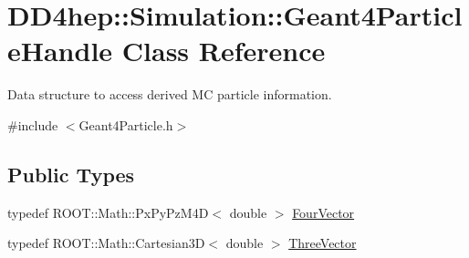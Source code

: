 \hypertarget{class_d_d4hep_1_1_simulation_1_1_geant4_particle_handle}{}\section{D\+D4hep\+:\+:Simulation\+:\+:Geant4\+Particle\+Handle Class Reference}
\label{class_d_d4hep_1_1_simulation_1_1_geant4_particle_handle}


Data structure to access derived MC particle information.  




{\ttfamily \#include $<$Geant4\+Particle.\+h$>$}

\subsection*{Public Types}
\begin{DoxyCompactItemize}
\item 
typedef R\+O\+O\+T\+::\+Math\+::\+Px\+Py\+Pz\+M4D$<$ double $>$ \hyperlink{class_d_d4hep_1_1_simulation_1_1_geant4_particle_handle_a79648f819b70d2f741fd1a5e19dc2f23}{Four\+Vector}
\item 
typedef R\+O\+O\+T\+::\+Math\+::\+Cartesian3D$<$ double $>$ \hyperlink{class_d_d4hep_1_1_simulation_1_1_geant4_particle_handle_a8aabe9ad3397b25aae653c42ec82021a}{Three\+Vector}
\end{DoxyCompactItemize}
